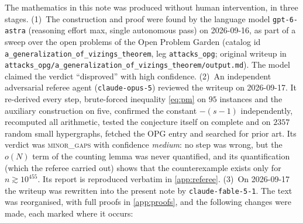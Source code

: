 \documentclass[11pt,a4paper]{article}
\theoremstyle{plain}
\theoremstyle{definition}
\theoremstyle{remark}
\begin{document}
The mathematics in this note was produced without human intervention, in three stages.
(1)~The construction and proof were found by the language model \texttt{gpt-6-astra} (reasoning effort max, single autonomous pass) on 2026-09-16, as part of a sweep over the open problems of the Open Problem Garden (catalog id \texttt{a\_generalization\_of\_vizings\_theorem}, leg \texttt{attacks\_opg}; original writeup in \texttt{attacks\_opg/a\_generalization\_of\_vizings\_theorem/output.md}). The model claimed the verdict ``disproved'' with high confidence.
(2)~An independent adversarial referee agent (\texttt{claude-opus-5}) reviewed the writeup on 2026-09-17. It re-derived every step, brute-forced inequality \eqref{eq:pm} on $95$ instances and the auxiliary construction on five, confirmed the constant $-(s-1)$ independently, recomputed all arithmetic, tested the conjecture itself on complete and on $2357$ random small hypergraphs, fetched the OPG entry and searched for prior art. Its verdict was \textsc{minor\_gaps} with confidence \emph{medium}: no step was wrong, but the $o(N)$ term of the counting lemma was never quantified, and its quantification (which the referee carried out) shows that the counterexample exists only for $n\gtrsim10^{455}$. Its report is reproduced verbatim in \cref{app:referee}.
(3)~On 2026-09-17 the writeup was rewritten into the present note by \texttt{claude-fable-5-1}. The text was reorganised, with full proofs in \cref{app:proofs}, and the following changes were made, each marked where it occurs:
\end{document}
